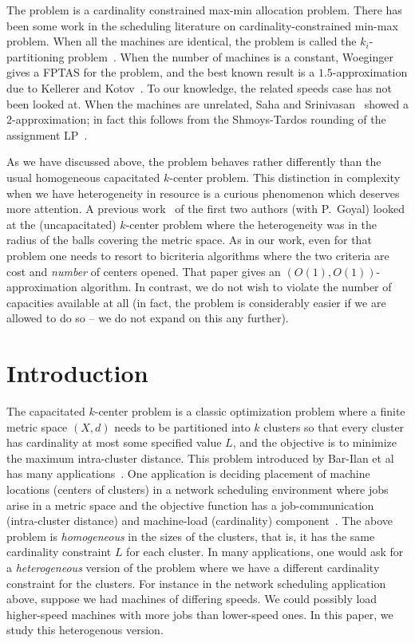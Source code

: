 The \cckp problem is a cardinality constrained max-min allocation problem. There has been some work in the scheduling literature on cardinality-constrained min-max problem.
When all the machines are identical, the problem is called the $k_i$-partitioning problem~\cite{BabelKK98}.
When the number of machines is a constant, Woeginger~\cite{Woe05} gives a FPTAS for the problem, and the best known result is a $1.5$-approximation due to Kellerer and Kotov~\cite{KellererK11}.
To our knowledge, the related speeds case has not been looked at. When the machines are unrelated,  Saha and Srinivasan~\cite{SahaS10} showed a $2$-approximation; in fact this follows from the Shmoys-Tardos rounding of the assignment LP~\cite{ShmoysT93}.\smallskip

As we have discussed above, the \mckc problem behaves rather differently than the usual homogeneous capacitated $k$-center problem. This distinction in complexity when we have heterogeneity  in resource is a curious phenomenon which deserves more attention.
A previous work~\cite{ChakrabartyGK16} of the first two authors (with P.~Goyal) looked at the (uncapacitated) $k$-center problem where the heterogeneity was in the radius of the balls covering the metric space.
As in our work, even for that problem one needs to resort to bicriteria algorithms where the two criteria are cost and {\em number} of centers opened. That paper gives an $\left(O(1),O(1)\right)$-approximation algorithm.
In contrast, we do not wish to violate the number of capacities available at all (in fact, the problem is considerably easier if we are allowed to do so -- we do not expand on this any further).




\fi




\section{Introduction}
The capacitated $k$-center problem is a classic optimization problem where a finite metric space $(X,d)$ needs to be partitioned into $k$ clusters so that  every  cluster has cardinality at most
some specified value $L$, and the objective is to minimize the maximum intra-cluster distance. This problem introduced by Bar-Ilan et al~\cite{Bar-IlanKP93} has many applications~\cite{LuptonMY98,MorganL77,Murthy1983AnAA}. %
One application is deciding placement of machine locations (centers of clusters) in a network scheduling environment where jobs arise in a metric space and the objective function has a  job-communication (intra-cluster distance) and machine-load (cardinality)
component~\cite{PSW97}. %
 The above problem is {\em homogeneous} in the sizes of the clusters, that is, it has the same cardinality constraint $L$ for each cluster. In many applications, one would ask for a \emph{heterogeneous} version of the problem where we have a different cardinality constraint for the clusters.
For instance in the network scheduling application above, suppose we had machines of differing speeds. We could possibly load higher-speed machines with more jobs than lower-speed ones. In this paper, we study  this heterogenous version.

